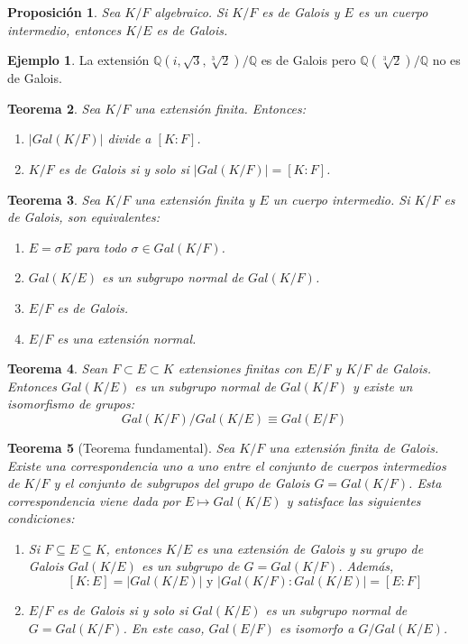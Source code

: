 \documentclass{report}
\newtheorem{theorem}{Teorema}[chapter]
\newtheorem{proposition}[theorem]{Proposición}
\theoremstyle{remark}
\theoremstyle{definition}
\theoremstyle{definition}
\theoremstyle{definition}
\newtheorem*{example}{Ejemplo}
\begin{document}
\begin{proposition}
    Sea $K/F$ algebraico. Si $K/F$ es de Galois y $E$ es un cuerpo intermedio, entonces $K/E$ es de Galois.
\end{proposition}

\begin{example}
    La extensión $\mathbb{Q}(i, \sqrt{3}, \sqrt[3]{2})/\mathbb{Q}$ es de Galois pero $\mathbb{Q}(\sqrt[3]{2})/\mathbb{Q}$ no es de Galois.
\end{example}

\begin{theorem}
    Sea $K/F$ una extensión finita. Entonces:
    \begin{enumerate}
        \item $|Gal(K/F)|$ divide a $[K : F]$.
        \item $K/F$ es de Galois si y solo si $|Gal(K/F)| = [K : F]$.
    \end{enumerate}
\end{theorem}

\begin{theorem}
    Sea $K/F$ una extensión finita y $E$ un cuerpo intermedio. Si $K/F$ es de Galois, son equivalentes:
    \begin{enumerate}
        \item $E = \sigma E$ para todo $\sigma \in Gal(K/F)$.
        \item $Gal(K/E)$ es un subgrupo normal de $Gal(K/F)$.
        \item $E/F$ es de Galois.
        \item $E/F$ es una extensión normal.
    \end{enumerate}
\end{theorem}

\begin{theorem}
    Sean $F \subset E \subset K$ extensiones finitas con $E/F$ y $K/F$ de Galois.
    Entonces $Gal(K/E)$ es un subgrupo normal de $Gal(K/F)$ y existe un isomorfismo de grupos:
    $$Gal(K/F)/Gal(K/E) \equiv Gal(E/F)$$
\end{theorem}

\begin{theorem}[Teorema fundamental]
    Sea $K/F$ una extensión finita de Galois.
    Existe una correspondencia uno a uno entre el conjunto de cuerpos intermedios de $K/F$ y el conjunto de subgrupos del grupo de Galois $G = Gal(K/F)$.
    Esta correspondencia viene dada por $E \mapsto Gal(K/E)$ y satisface las siguientes condiciones:
    \begin{enumerate}
        \item Si $F \subseteq E \subseteq K$, entonces $K/E$ es una extensión de Galois y su grupo de Galois $Gal(K/E)$ es un subgrupo de $G = Gal(K/F)$. Además, $$[K : E] = |Gal(K/E)| \text{ y } |Gal(K/F) : Gal(K/E)| = [E : F]$$
        \item $E/F$ es de Galois si y solo si $Gal(K/E)$ es un subgrupo normal de $G = Gal(K/F)$. En este caso, $Gal(E/F)$ es isomorfo a $G/Gal(K/E)$.
    \end{enumerate}
\end{theorem}
\end{document}
